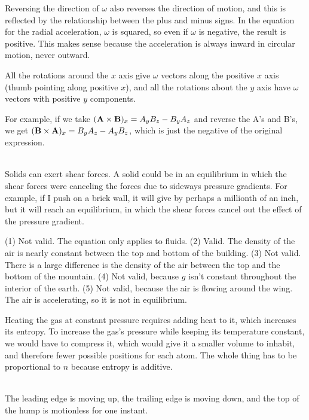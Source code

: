  Reversing the direction of $\omega$ also reverses the direction of 
motion, and this is reflected by the relationship between the plus and minus signs.
 In the equation for the radial acceleration, $\omega$ is squared, so even if $\omega$
 is negative, the
 result is positive. This makes sense because the acceleration is always inward in
 circular motion, never outward.

 All the rotations around the $x$ axis give $\omega$ vectors 
along the positive $x$ axis (thumb pointing along positive $x$), and all the rotations about 
the $y$ axis have $\omega$ vectors with positive $y$ components.

 For example, if we take
 $(\textbf{A}\times\textbf{B})_x=  A_yB_z - B_yA_z$ and reverse the A's and B's, we
get $(\textbf{B}\times\textbf{A})_x=  B_yA_z - A_yB_z$, which is just the negative of
the original expression.

\noindent{}\\
 Solids can exert shear forces. A solid could be
in an equilibrium in which the shear forces were canceling the forces due to
sideways pressure gradients. For example, if I push on a brick wall, it will give by
perhaps a millionth of an inch, but it will reach an equilibrium, in which the shear forces
cancel out the effect of the pressure gradient.

 (1) Not valid. The equation only applies to fluids. (2)
Valid. The density of the air is nearly constant between the
top and bottom of the building. (3) Not valid. There is a
large difference is the density of the air between the top
and the bottom of the mountain. (4) Not valid, because $g$
isn't constant throughout the interior of the earth. (5) Not
valid, because the air is flowing around the wing. The air
is accelerating, so it is not in equilibrium.

 Heating the gas at constant pressure requires
adding heat to it, which increases its entropy. To increase the gas's pressure
while keeping its temperature constant, we would have to compress it,
which would give it a smaller volume to inhabit, and therefore fewer possible
positions for each atom. The whole thing has to be proportional to $n$ because
entropy is additive.


\noindent{}\\
 The leading edge is moving up, the trailing edge is moving
down, and the top of the hump is motionless for one instant.

